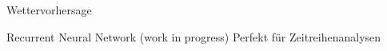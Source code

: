\begin{frame}[t]{Wettervorhersage}
  \begin{block}{Recurrent Neural Network \tiny\alert{(work in progress)}}
    Perfekt für Zeitreihenanalysen
  \end{block}
\end{frame}
